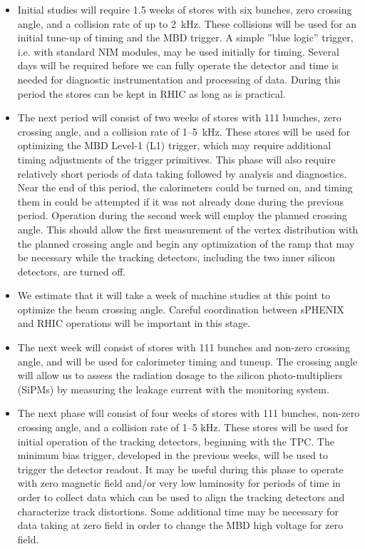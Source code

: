 \begin{itemize}

\item Initial studies will require 1.5 weeks of stores with six
  bunches, zero crossing angle, and a collision rate of up to 2~kHz.
  These collisions will be used for an initial tune-up of timing and
  the MBD trigger.  A simple ''blue logic'' trigger, i.e. with standard NIM modules, may be used
  initially for timing.  Several days will be required before we can
  fully operate the detector and time is needed for diagnostic
  instrumentation and processing of data.   During this period the stores can be kept in
  RHIC as long as is practical.

\item The next period will consist of two weeks of stores with 111
  bunches, zero crossing angle, and a collision rate of 1--5~kHz.
  These stores will be used for optimizing the MBD Level-1 (L1)
  trigger, which may require additional timing adjustments of the
  trigger primitives.  This phase will also require relatively short
  periods of data taking followed by analysis and diagnostics.  Near
  the end of this period, the calorimeters could be turned on, and
  timing them in could be attempted if it was not already done during
  the previous period.  Operation during the second week will employ
  the planned crossing angle.  This should allow the first measurement
  of the vertex distribution with the planned crossing angle and
  begin any optimization of the ramp that may be necessary while the
  tracking detectors, including the two inner silicon detectors, are
  turned off.

\item We estimate that it will take a week of machine studies at this
  point to optimize the beam crossing angle.  Careful coordination
  between sPHENIX and RHIC operations will be important in this stage.

\item The next week will consist of stores with 111 bunches and
  non-zero crossing angle, and will be used for calorimeter timing and
  tuneup.  The crossing angle will allow us to assess the radiation
  dosage to the silicon photo-multipliers (SiPMs) by measuring the
  leakage current with the monitoring system.

\item The next phase will consist of four weeks of stores with 111
  bunches, non-zero crossing angle, and a collision rate of 1--5 kHz.
  These stores will be used for initial operation of the tracking
  detectors, beginning with the TPC.  The minimum bias trigger,
  developed in the previous weeks, will be used to trigger the
  detector readout.  It may be useful during this phase to operate with zero
  magnetic field and/or very low luminosity for periods of time in
  order to collect data which can be used to align the tracking
  detectors and characterize track distortions.  Some additional time
  may be necessary for data taking at zero field in order to change
  the MBD high voltage for zero field.


\end{itemize}

